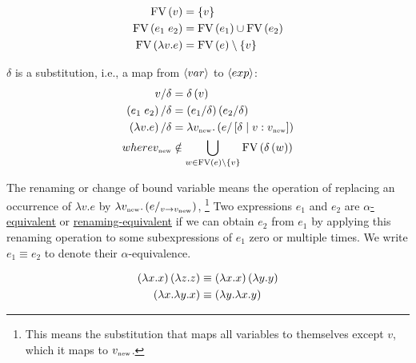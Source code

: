 \begin{enumcirc}
\begin{enumrm}
		\item
		\begin{align*}
			\textrm{FV}\left(  v  \right)            & = \left\{ v \right\}                  \\
			\textrm{FV}\left(  e_1 \; e_2  \right)   & = \textrm{FV}\left(  e_1  \right) \cup \textrm{FV}\left(  e_2  \right)      \\
			\textrm{FV}\left(  \lambda v. e  \right) & = \textrm{FV}\left(  e  \right) \setminus \left\{ v \right\} \\
		\end{align*}
		\item
		$\delta$ is a substitution, i.e., a map from $\left\langle var \right\rangle$ to $\left\langle exp \right\rangle$:
		\begin{align*}
			v / \delta                    & = \delta\left( v \right)                                                             \\
			\left( e_1 \; e_2 \right) / \delta   & = \left( e_1 / \delta \right) \left( e_2 / \delta \right)                                   \\
			\left( \lambda v. e \right) / \delta & = \lambda v_{\textrm{\tiny new}}. \left( e / \left[ \delta \; \middle\vert \; v: v_{\textrm{\tiny new}} \right] \right) \\
			where v_{\textrm{\tiny new}}      & \notin \bigcup_{w \in \textrm{FV}\left(  e  \right) \setminus \left\{ v \right\}} \textrm{FV}\left(  \delta\left( w \right)  \right)
		\end{align*}
		\item
		The renaming or change of bound variable means the operation of replacing an
		occurrence of $\lambda v. e$ by
		$\lambda v_{\textrm{\tiny new}}. \left( e/_{v \rightarrow v_{\textrm{\tiny new}}} \right)$,
		\footnote{
			This means the substitution that maps all variables to themselves except $v$, which
			it maps to $v_{\textrm{\tiny new}}$.
		}
		Two expressions $e_1$ and $e_2$ are \ul{$\alpha$-equivalent} or
		\ul{renaming-equivalent} if we can obtain $e_2$ from $e_1$ by applying this
		renaming operation to some subexpressions of $e_1$ zero or multiple times.
		We write $e_1 \equiv e_2$ to denote their $\alpha$-equivalence.
		\begin{example}
			\begin{align*}
				\left( \lambda x. x \right) \left( \lambda z. z \right) & \equiv
				\left( \lambda x. x \right) \left( \lambda y. y \right)          \\
				\left( \lambda x. \lambda y. x \right)           & \equiv
				\left( \lambda y. \lambda x. y \right)                    \\
			\end{align*}
		\end{example}
	\end{enumrm}
\end{enumcirc}


